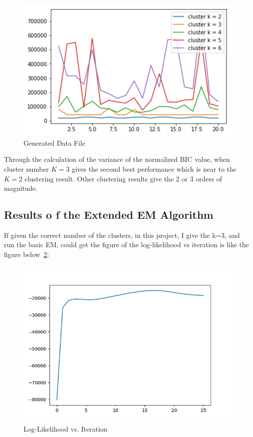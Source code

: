 \documentclass[11pt, a4paper]{article}
\begin{document}
\begin{figure}[htbp]
	
	\centering 
	\includegraphics[width=12cm]{5_2}
	
	\caption{Generated Data File}
	\label{fig:5-2}
	
\end{figure}

Through the calculation of the variance of the normalized BIC value, when cluster number $K=3$ gives the second best performance which is near to the $K=2$ clustering result. Other clustering results give the 2 or 3 orders of magnitude.


\subsection{Results o f the Extended EM Algorithm}

If given the correct number of the clusters, in this project, I give the k=3, and run the basic EM, could get the figure of the log-likelihood vs iteration is like the figure below~\ref{fig:5-3}:


\begin{figure}[htbp]
	
	\centering 
	\includegraphics[width=12cm]{5_3_1}
	
	\caption{Log-Likelihood vs. Iteration}
	\label{fig:5-3}
	
\end{figure}
\end{document}
